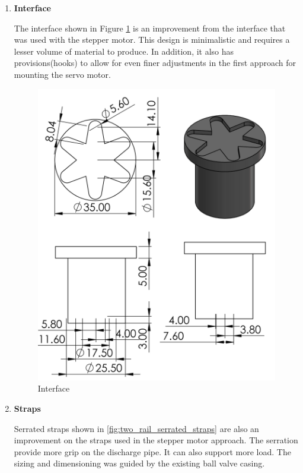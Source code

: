 \begin{enumerate}
\begin{enumerate}
    \item \textbf{Interface}
    \par
    The interface shown in Figure \ref{fig:interface2} is an improvement from the interface that was used with the stepper motor. This design is minimalistic and requires a lesser volume of material to produce. In addition, it also has provisions(hooks) to allow for even finer adjustments in the first approach for mounting the servo motor.
    \begin{figure}[H]
        \centering
        \includegraphics[height=.5\textheight]{Figures/Interface.PNG}
        \caption{Interface}
        \label{fig:interface2}
    \end{figure}
    \par
    \item \textbf{Straps}
    \par
    Serrated straps shown in \ref{fig:two_rail_serrated_straps} are also an improvement on the straps used in the stepper motor approach. The serration provide more grip on the discharge pipe. It can also support more load. The sizing and dimensioning was guided by the existing ball valve casing.

\end{enumerate}
\end{enumerate}
